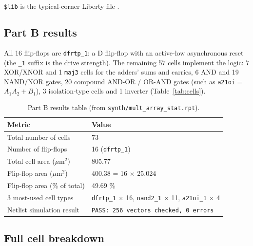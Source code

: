 \documentclass[10pt,a4paper,twocolumn]{article}
\newcommand{\umsq}{$\mu$m$^2$}
\newcommand{\cell}[1]{\texttt{#1}}
\begin{document}
\texttt{\$lib} is the typical-corner Liberty file
.

\subsection{Part B results}

All 16 flip-flops are \cell{dfrtp\_1}: a D flip-flop with an active-low asynchronous reset (the \cell{\_1}
suffix is the drive strength). The remaining 57 cells implement the logic: 7 XOR/XNOR and 1 \cell{maj3}
cells for the adders' sums and carries, 6 AND and 19 NAND/NOR gates, 20 compound AND-OR / OR-AND gates
(such as \cell{a21oi} = $\overline{A_1A_2 + B_1}$), 3 isolation-type cells and 1 inverter
(Table~\ref{tab:cells}).

\begin{table}[!htbp]
\centering
\footnotesize
\begin{tabularx}{\columnwidth}{lY}
\toprule
\textbf{Metric} & \textbf{Value} \\
\midrule
Total number of cells & 73 \\
Number of flip-flops & 16 (\cell{dfrtp\_1}) \\
Total cell area (\umsq) & 805.77 \\
Flip-flop area (\umsq) & 400.38 = 16 $\times$ 25.024 \\
Flip-flop area (\% of total) & 49.69 \% \\
3 most-used cell types & \cell{dfrtp\_1} $\times$ 16, \cell{nand2\_1} $\times$ 11, \cell{a21oi\_1} $\times$ 4 \\
Netlist simulation result & \texttt{PASS: 256 vectors checked, 0 errors} \\
\bottomrule
\end{tabularx}
\caption{Part B results table (from \texttt{synth/mult\_array\_stat.rpt}).}
\end{table}

\subsection{Full cell breakdown}
\end{document}
